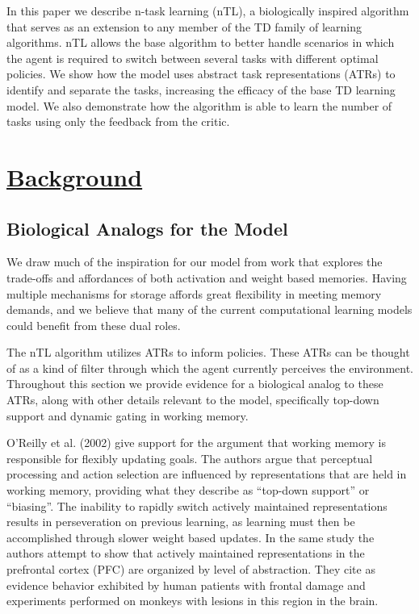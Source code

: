 \documentclass[10pt,letterpaper]{article}
\begin{document}
In this paper we describe n-task learning (nTL), a biologically inspired algorithm that serves as an extension to any member of the TD family of learning algorithms. nTL allows the base algorithm to better handle scenarios in which the agent is required to switch between several tasks with different optimal policies. We show how the model uses abstract task representations (ATRs) to identify and separate the tasks, increasing the efficacy of the base TD learning model. We also demonstrate how the algorithm is able to learn the number of tasks using only the feedback from the critic.

\section{\underline{Background}}

\subsection{Biological Analogs for the Model}

We draw much of the inspiration for our model from work that explores the trade-offs and affordances of both activation and weight based memories. Having multiple mechanisms for storage affords great flexibility in meeting memory demands, and we believe that many of the current computational learning models could benefit from these dual roles.

The nTL algorithm utilizes ATRs to inform policies. These ATRs can be thought of as a kind of filter through which the agent currently perceives the environment. Throughout this section we provide evidence for a biological analog to these ATRs, along with other details relevant to the model, specifically top-down support and dynamic gating in working memory.

O'Reilly et al. (2002) give support for the argument that working memory is responsible for flexibly updating goals. The authors argue that perceptual processing and action selection are influenced by representations that are held in working memory, providing what they describe as ``top-down support'' or ``biasing''. The inability to rapidly switch actively maintained representations results in perseveration on previous learning, as learning must then be accomplished through slower weight based updates. In the same study the authors attempt to show that actively maintained representations in the prefrontal cortex (PFC) are organized by level of abstraction. They cite as evidence behavior exhibited by human patients with frontal damage and experiments performed on monkeys with lesions in this region in the brain.
\end{document}
